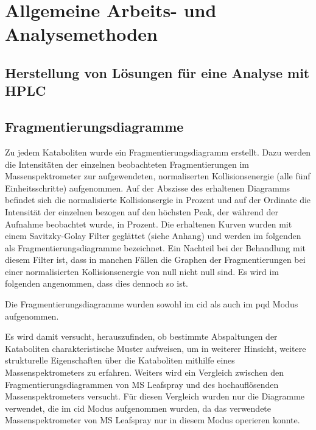 \chapter{Allgemeine Arbeits- und Analysemethoden}

\section{Herstellung von Lösungen für eine Analyse mit HPLC}

\section{Fragmentierungsdiagramme} \label{sec:fragmentierungsdiagramme}

Zu jedem Kataboliten wurde ein Fragmentierungsdiagramm erstellt. Dazu werden die Intensitäten der einzelnen beobachteten Fragmentierungen im Massenspektrometer zur aufgewendeten, normaliserten Kollisionsenergie (alle fünf Einheitsschritte) aufgenommen. Auf der Abszisse des erhaltenen Diagramms befindet sich die normalisierte Kollisionsergie in Prozent und auf der Ordinate die Intensität der einzelnen bezogen auf den höchsten Peak, der während der Aufnahme beobachtet wurde, in Prozent. Die erhaltenen Kurven wurden mit einem Savitzky-Golay Filter geglättet (siehe Anhang) und werden im folgenden als Fragmentierungsdiagramme bezeichnet. Ein Nachteil bei der Behandlung mit diesem Filter ist, dass in manchen Fällen die Graphen der Fragmentierungen bei einer normalisierten Kollisionsenergie von null nicht null sind. Es wird im folgenden angenommen, dass dies dennoch so ist.

Die Fragmentierungsdiagramme wurden sowohl im \gls{cid} als auch im \gls{pqd} Modus aufgenommen. 

Es wird damit versucht, herauszufinden, ob bestimmte Abspaltungen der Kataboliten charakteristische Muster aufweisen, um in weiterer Hinsicht, weitere strukturelle Eigenschaften über die Kataboliten mithilfe eines Massenspektrometers zu erfahren. Weiters wird ein Vergleich zwischen den Fragmentierungsdiagrammen von MS Leafspray und des hochauflösenden Massenspektrometers versucht. Für diesen Vergleich wurden nur die Diagramme verwendet, die im \gls{cid} Modus aufgenommen wurden, da das verwendete Massenspektrometer von MS Leafspray nur in diesem Modus operieren konnte.